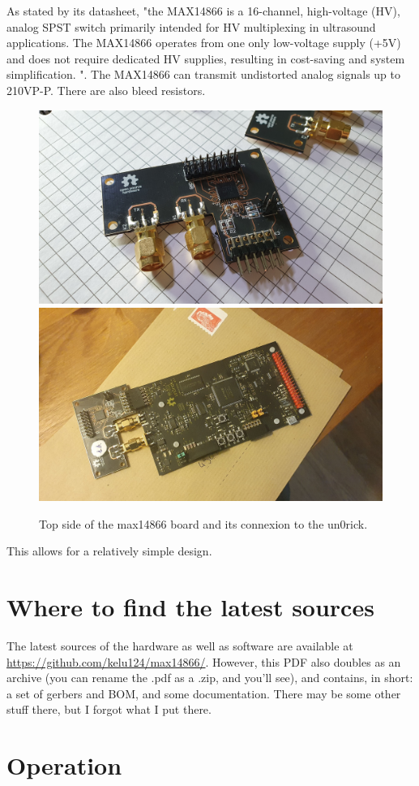 \documentclass{article}
\begin{document}
As stated by its datasheet, "the MAX14866 is a 16-channel, high-voltage (HV), analog SPST switch primarily intended for HV multiplexing in ultrasound applications. The MAX14866 operates from one only low-voltage supply (+5V) and does not require dedicated HV supplies, resulting in cost-saving and system simplification. ". The MAX14866 can transmit undistorted analog signals up to 210VP-P. There are also bleed resistors.

\begin{figure}[htp!]
  \centering
  \includegraphics[width=.5\textwidth]{../src/images/20210323_210151.jpg}\hfill
  \includegraphics[width=.5\textwidth]{../src/images/20210329_122144.jpg} 
  \caption{Top side of the max14866 board and its connexion to the un0rick.} 
  \label{fig:desc}
\end{figure}
  
This allows for a relatively simple design.


\section{Where to find the latest sources} 
 

The latest sources of the hardware as well as software are available at \url{https://github.com/kelu124/max14866/}. However, this PDF also doubles as an archive (you can rename the .pdf as a .zip, and you'll see), and contains, in short: a set of gerbers and BOM, and some documentation. There may be some other stuff there, but I forgot what I put there.

\section{Operation} 
\end{document}
